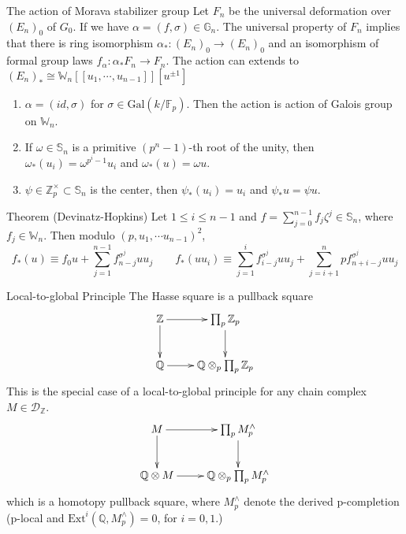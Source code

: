 \documentclass[aspectratio=1610]{ctexbeamer}
\def  \Ext      {\mathrm{Ext}}
\def  \Gal      {\mathrm{Gal}}
\def  \cd       {\mathcal{D}}
\def  \bF       {\mathbb{F}}
\def  \bq       {\mathbb{Q}}
\def  \bs       {\mathbb{S}}
\def  \bz       {\mathbb{Z}}
\begin{document}
\begin{frame}{The action of Morava stabilizer group}
	Let $F_n$ be the universal deformation  over $(E_n)_0$  of $G_0$.  If we have $ \alpha =(f, \sigma) \in \mathbb{G}_n$. The universal property of $F_n$ implies that there is  ring isomorphism $\alpha_*:(E_n)_0 \to (E_n)_0$ and an isomorphism of formal group laws $f_{\alpha}: \alpha_* F_n  \to F_n $. The action can extends to $(E_n)_* \cong \mathbb{W}_n [\![u_1, \cdots ,u_{n-1}]\!][u^{\pm 1}] $
	
	\begin{enumerate}
		\item $\alpha = (id, \sigma)$ for  $\sigma  \in \Gal(k/\bF_p)$. Then the action is action of Galois group on $\mathbb{W}_n$.
		\item  If $\omega \in \mathbb{S}_n$ is  a primitive $(p^n-1)$-th root of the unity, then $\omega_*(u_i) = \omega^{p^i-1}u_i$ and $\omega_*(u) = \omega u$.
		\item $\psi \in  \mathbb{Z}_p^{\times} \subset \mathbb{S}_n$ is the center, then $\psi_* (u_i)=u_i$ and $\psi_* u = \psi u$.
	\end{enumerate}
	
	\begin{alertblock}{Theorem (Devinatz-Hopkins)} Let $1 \leq i  \leq n-1$ and $f =  \sum_{j=0}^{n-1}f_j  \zeta^j  \in                      \bs_n$, where $f_j \in \mathbb{W}_n$. Then modulo $(p,u_1, \cdots u_{n-1})^2$,
		$$
		f_*(u)  \equiv  f_0 u+  \sum_{j=1}^{n-1} f_{n-j}^{\sigma^j}u u_j   \qquad  f_*(uu_i) \equiv \sum_{j=1}^{i} f_{i-j}^{\sigma^j} uu_j +  \sum_{j=i+1}^{n} p f_{n+i-j}^{\sigma^j} uu_j
		$$ 
		
	\end{alertblock}
\end{frame}






\begin{frame}{Local-to-global Principle}
	The Hasse square is a pullback square 
	$$
	\xymatrix{
		\bz   \ar[r]  \ar[d]  &  \prod_p \bz_p  \ar[d] \\
		\bq  \ar[r]          &  \bq \otimes_p  \prod_p \bz_p
	}
	$$
	This is  the  special case of a local-to-global principle for any chain complex $M \in \cd_{\bz}$.
	$$
	\xymatrix{
		M   \ar[r]  \ar[d]  &  \prod_p M^{\wedge}_p  \ar[d] \\
		\bq \otimes M  \ar[r]          &  \bq \otimes_p  \prod_p M^{\wedge}_p
	}
	$$	which is a homotopy pullback square, where $M^{\wedge}_p$ denote the derived  p-completion (p-local and $\Ext^i(\bq, M^{\wedge}_p) =0$, for $i=0,1$.)
\end{frame}
\end{document}
